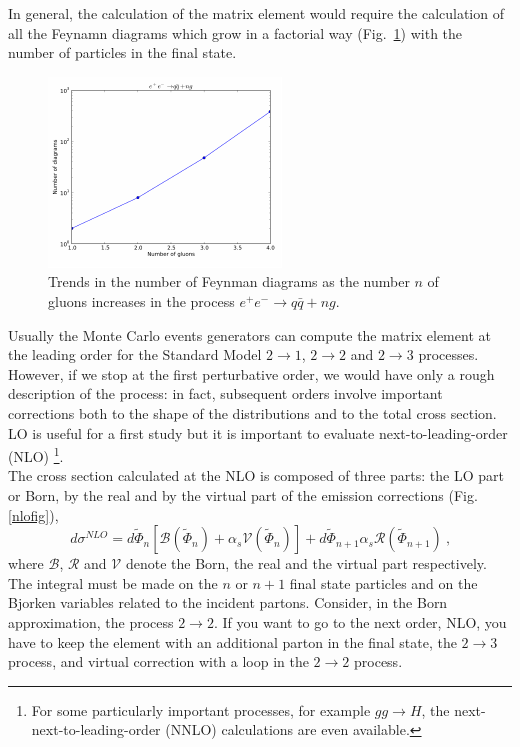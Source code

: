 In general, the calculation of the matrix element would require the calculation of all the Feynamn diagrams which  grow in a factorial way (Fig.~\ref{fatt}) with the number of particles in the final state.
\begin{figure}[h]
\centering
\includegraphics[scale= 2.5]{../Cap3/Fig_MC/fattoriale}
\caption{ Trends in the number of Feynman diagrams as the number $ n $ of gluons increases in the process $e^+ e^- \rightarrow q \bar{q} + ng$.}
\label{fatt}
\end{figure}
Usually the  Monte Carlo events generators can compute the matrix element at the leading order for the Standard Model $2 \rightarrow 1$,  $2 \rightarrow 2$  
and  $2 \rightarrow 3$ \cite{bib:madgraph} processes.  \\
However, if we stop at the first perturbative order, we would have only a rough description of the process: in fact, subsequent orders involve important corrections both to the shape of the distributions and to the total cross section. LO is useful for a first study but  it is important to evaluate next-to-leading-order (NLO) \footnote{For some particularly important processes, for example $ gg \rightarrow H $, the next-next-to-leading-order (NNLO) calculations are even available.}. \\
The cross section calculated at the NLO is composed of three parts: the LO part or Born, by the real and by the virtual part of the emission corrections (Fig. \ref{nlofig}),
\begin{equation}
 \label{xsecNLO}
 d\sigma^{NLO} =  d \tilde{\Phi}_n [\mathcal{B} (  \tilde{\Phi}_n  ) + \alpha_s \mathcal{V}(  \tilde{\Phi}_n  ) ] +  d \tilde{\Phi}_{n+1} \alpha_s \mathcal{R}(\tilde{\Phi}_{n+1}  ) \: \mbox{,}   \end{equation}
 where $\mathcal{B}$, $\mathcal{R}$ and $\mathcal{V}$  denote the Born, the real  and the virtual part respectively. The integral must be made on the $ n $ or $ n + 1 $ final state particles and on the Bjorken variables related to the incident partons.
Consider, in the Born approximation, the process  $ 2 \rightarrow 2 $. If you want to go to the next order, NLO, you have to keep the element with an additional parton in the final state, the $ 2 \rightarrow 3 $ process, and virtual correction with a loop in the $ 2 \rightarrow 2 $ process.
